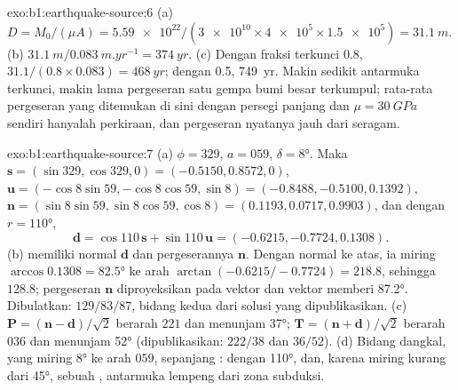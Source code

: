 \begin{solution}{exo:b1:earthquake-source:6}
(a) $D = M_0/(\mu A) = \num{5.59e22}/(\num{3e10}\times\num{4e5}\times\num{1.5e5})
= \qty{31.1}{m}$. (b) $\qty{31.1}{m}/\qty{0.083}{m.yr^{-1}} = \qty{374}{yr}$.
(c) Dengan fraksi terkunci 0.8, $31.1/(0.8\times0.083) = \qty{468}{yr}$; dengan
0.5, \qty{749}{yr}. Makin sedikit antarmuka terkunci, makin lama pergeseran satu gempa bumi besar terkumpul; rata-rata pergeseran yang ditemukan di sini dengan persegi panjang  dan $\mu = \qty{30}{GPa}$ sendiri hanyalah perkiraan, dan pergeseran nyatanya jauh dari seragam.
\end{solution}

\begin{solution}{exo:b1:earthquake-source:7}
(a)  $\phi = 329$,  $a = 059$,  $\delta =
\ang{8}$. Maka $\mathbf s = (\sin329, \cos329, 0) = (-0.5150, 0.8572, 0)$,
$\mathbf u = (-\cos8\sin59, -\cos8\cos59, \sin8) = (-0.8488, -0.5100, 0.1392)$,
$\mathbf n = (\sin8\sin59, \sin8\cos59, \cos8) = (0.1193, 0.0717, 0.9903)$,
dan dengan $r = \ang{110}$,
\[
  \mathbf d = \cos110\,\mathbf s + \sin110\,\mathbf u = (-0.6215, -0.7724, 0.1308) .
\]
(b)  memiliki normal $\mathbf d$ dan pergeserannya $\mathbf n$. Dengan normal ke atas, ia miring $\arccos 0.1308 = \ang{82.5}$ ke arah
$\arctan(-0.6215/-0.7724) = 218.8$, sehingga  $128.8$; pergeseran
$\mathbf n$ diproyeksikan pada vektor  dan vektor  memberi 
\ang{87.2}. Dibulatkan: $129/83/87$, bidang kedua dari solusi yang dipublikasikan.
(c) $\mathbf P = (\mathbf n - \mathbf d)/\sqrt2$ berarah $221$ dan menunjam
\ang{37}; $\mathbf T = (\mathbf n + \mathbf d)/\sqrt2$ berarah $036$ dan menunjam
\ang{52} (dipublikasikan: $222/38$ dan $36/52$). (d) Bidang dangkal, yang miring
\ang{8} ke arah $059$, sepanjang :  dengan 
\ang{110}, dan, karena miring kurang dari \ang{45}, sebuah , antarmuka lempeng dari zona subduksi.
\end{solution}

